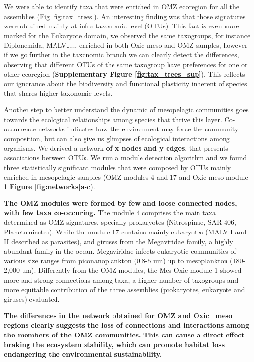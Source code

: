 \documentclass[fleqn,10pt]{wlscirep}
\begin{document}
We were able to identify taxa that were enriched in OMZ ecoregion for all the assemblies (Fig \ref{fig:tax_trees}). An interesting finding was that those signatures were obtained mainly at infra taxonomic level (OTUs). This fact is even more marked for the Eukaryote domain, we observed the same taxogroups, for instance Diplonemida, MALV….., enriched in both Oxic-meso and OMZ samples, however if we go further in the taxonomic branch we can clearly detect the differences, observing that different OTUs of the same taxogroup have preferences for one or other ecoregion (\textbf{Supplementary Figure \ref{fig:tax_trees_sup}}). This reflects our ignorance about the biodiversity and functional plasticity inherent of species that shares higher taxonomic levels.

Another step to better understand the dynamic of mesopelagic communities goes towards the ecological relationships among species that thrive this layer. Co-occurrence networks indicates how the environment may force the community composition, but can also give us glimpses of ecological interactions among organisms. We derived a network \textbf{of x nodes and y edges}, that presents associations between OTUs. We run a module detection algorithm and we found three statistically significant modules that were composed by OTUs mainly enriched in mesopelagic samples (OMZ-modules 4 and 17 and Oxic-meso module 1 \textbf{Figure \ref{fig:networks}a-c}).

\textbf{The OMZ modules were formed by few and loose connected nodes, with few taxa co-occuring.} The module 4 comprises the main taxa determined as OMZ signatures, specially prokaryotes (Nitrospinae, SAR 406, Planctomicetes). While the module 17 contains mainly eukaryotes (MALV I and II described as parasites), and giruses from the Megaviridae family, a highly abundant family in the ocean. Megaviridae infects eukaryotic communities of various size ranges from piconanoplankton (0.8-5 um) up to mesoplankton (180-2,000 um). Differently from the OMZ modules, the Mes-Oxic module 1 showed more and strong connections among taxa, a higher number of taxogroups and more equitable contribution of the three assemblies (prokaryotes, eukaryote and giruses) evaluated.

\textbf{The differences in the network obtained for OMZ and Oxic\_meso regions clearly suggests the loss of connections and interactions among the members of the OMZ communities. This can cause a direct effect braking the ecosystem stability, which can promote habitat loss endangering the environmental sustainability.}
\end{document}
